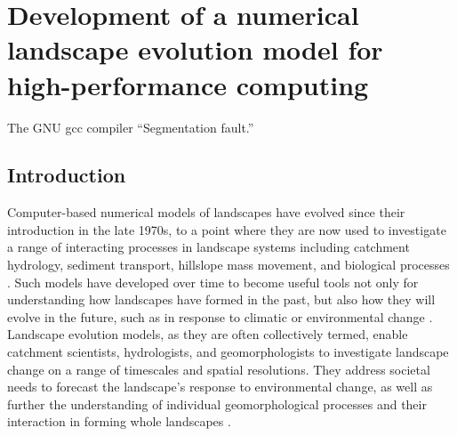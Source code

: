 \chapter{Development of a numerical landscape evolution model for high-performance computing}
\label{chapter_HAIL-CAESAR}

\begin{chapquote}{The GNU gcc compiler \textit{}}
``Segmentation fault.''
\end{chapquote}


\section{Introduction}
Computer-based numerical models of landscapes have evolved since their introduction in the late 1970s, \citep[e.g.,][]{ahnert1976quantitative} to a point where they are now used to investigate a range of interacting processes in landscape systems including catchment hydrology, sediment transport, hillslope mass movement, and biological processes \citep{Tucker2010, Willgoose2005, Pazzaglia2003}. Such models have developed over time to become useful tools not only for understanding how landscapes have formed in the past, but also how they will evolve in the future, such as in response to climatic or environmental change \citep{bras2003six, church2003geomorphological, pelletier2015forecasting}. Landscape evolution models, as they are often collectively termed, enable catchment scientists, hydrologists, and geomorphologists to investigate landscape change on a range of timescales and spatial resolutions. They address societal needs to forecast the landscape's response to environmental change, as well as further the understanding of individual geomorphological processes and their interaction in forming whole landscapes \citep{dietrich2003geomorphic}.


